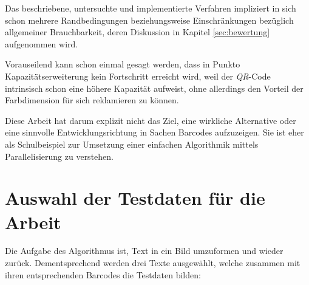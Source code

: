 \documentclass[11pt]{scrreprt} %
\theoremstyle{definition}
\begin{document}
Das beschriebene, untersuchte und implementierte Verfahren \cite{paper} impliziert in sich schon mehrere Randbedingungen beziehungsweise Einschränkungen bezüglich allgemeiner Brauchbarkeit, deren Diskussion in Kapitel \ref{sec:bewertung} aufgenommen wird.

Vorauseilend kann schon einmal gesagt werden, dass in Punkto Kapazitätserweiterung kein Fortschritt erreicht wird, weil der {\it QR}-Code intrinsisch schon eine höhere Kapazität aufweist, ohne allerdings den Vorteil der Farbdimension für sich reklamieren zu können.

Diese Arbeit hat darum explizit nicht das Ziel, eine wirkliche Alternative oder eine sinnvolle Entwicklungsrichtung in Sachen Barcodes aufzuzeigen. Sie ist eher als Schulbeispiel zur Umsetzung einer einfachen Algorithmik mittels Parallelisierung zu verstehen.

\chapter{Auswahl der Testdaten für die Arbeit}

Die Aufgabe des Algorithmus ist, Text in ein Bild umzuformen und wieder zurück. Dementsprechend werden drei Texte ausgewählt, welche zusammen mit ihren entsprechenden Barcodes die Testdaten bilden:
\end{document}
